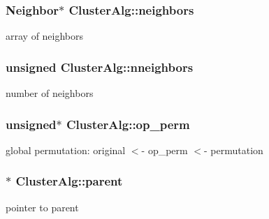 \hypertarget{classClusterAlg_a09156a9cf7570cde252131f25e599fbb}{
\subsubsection[{neighbors}]{\setlength{\rightskip}{0pt plus 5cm}\-Neighbor$\ast$ {\bf \-Cluster\-Alg\-::neighbors}}}
\label{classClusterAlg_a09156a9cf7570cde252131f25e599fbb}
array of neighbors \hypertarget{classClusterAlg_af1b22f77639a805d28569806d561600e}{
\subsubsection[{nneighbors}]{\setlength{\rightskip}{0pt plus 5cm}unsigned {\bf \-Cluster\-Alg\-::nneighbors}}}
\label{classClusterAlg_af1b22f77639a805d28569806d561600e}
number of neighbors \hypertarget{classClusterAlg_a4f06e1465978072d8c6bd098e062b701}{
\subsubsection[{op\-\_\-perm}]{\setlength{\rightskip}{0pt plus 5cm}unsigned$\ast$ {\bf \-Cluster\-Alg\-::op\-\_\-perm}}}
\label{classClusterAlg_a4f06e1465978072d8c6bd098e062b701}
global permutation\-: original $<$-\/ op\-\_\-perm $<$-\/ permutation \hypertarget{classClusterAlg_a1b63bc64e4622216b0539c4a5b76d3c2}{
\subsubsection[{parent}]{$\ast$ {\bf \-Cluster\-Alg\-::parent}}}
\label{classClusterAlg_a1b63bc64e4622216b0539c4a5b76d3c2}
pointer to parent 

